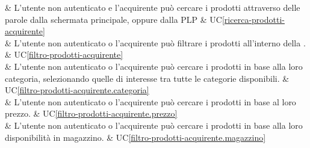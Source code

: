  & L'utente non autenticato e l'acquirente può cercare i prodotti attraverso delle parole dalla schermata principale, oppure dalla PLP & UC\ref{ricerca-prodotti-acquirente} \\

 & L'utente non autenticato o l'acquirente può filtrare i prodotti all'interno della . & UC\ref{filtro-prodotti-acquirente} \\

 & L'utente non autenticato o l'acquirente può cercare i prodotti in base alla loro categoria, selezionando quelle di interesse tra tutte le categorie disponibili. & UC\ref{filtro-prodotti-acquirente.categoria} \\

 & L'utente non autenticato o l'acquirente può cercare i prodotti in base al loro prezzo. & UC\ref{filtro-prodotti-acquirente.prezzo} \\

 & L'utente non autenticato o l'acquirente può cercare i prodotti in base alla loro disponibilità in magazzino. & UC\ref{filtro-prodotti-acquirente.magazzino} \\
